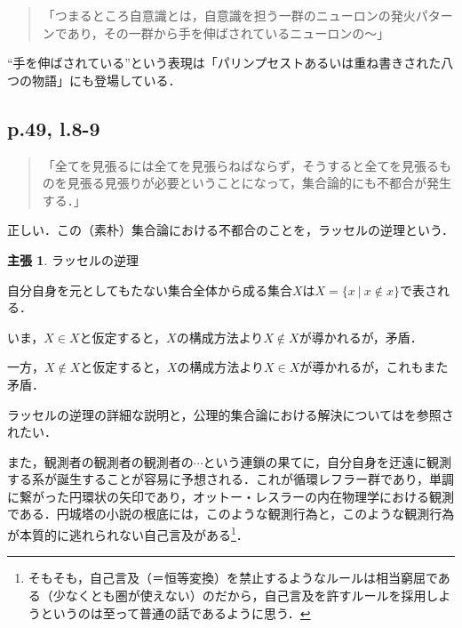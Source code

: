 \documentclass[10pt, a5paper, twoside]{jsarticle}
\theoremstyle{definition}
\newtheorem{clm}{主張}
\begin{document}
                \begin{quote}

                    「つまるところ自意識とは，自意識を担う一群のニューロンの発火パターンであり，その一群から手を伸ばされているニューロンの〜」

                \end{quote}

                “手を伸ばされている”という表現は「パリンプセストあるいは重ね書きされた八つの物語」にも登場している．

            \subsection{p.49, l.8-9} \label{russel}

                \begin{quote}

                    「全てを見張るには全てを見張らねばならず，そうすると全てを見張るものを見張る見張りが必要ということになって，集合論的にも不都合が発生する．」

                \end{quote}

                正しい．この（素朴）集合論における不都合のことを，ラッセルの逆理という．

                \begin{clm}

					ラッセルの逆理

					自分自身を元としてもたない集合全体から成る集合$X$は$X = \{ x \ |\  x \notin x\} $で表される．

					いま，$X \in X$と仮定すると，$X$の構成方法より$X \notin X$が導かれるが，矛盾．

					一方，$X \notin X$と仮定すると，$X$の構成方法より$X \in X$が導かれるが，これもまた矛盾．

				\end{clm}

                ラッセルの逆理の詳細な説明と，公理的集合論における解決については\cite{rus}を参照されたい．

                また，観測者の観測者の観測者の$\cdots$という連鎖の果てに，自分自身を迂遠に観測する系が誕生することが容易に予想される．これが循環レフラー群であり，単調に繋がった円環状の矢印であり，オットー・レスラーの内在物理学における観測である．円城塔の小説の根底には，このような観測行為と，このような観測行為が本質的に逃れられない自己言及がある\footnote{そもそも，自己言及（＝恒等変換）を禁止するようなルールは相当窮屈である（少なくとも圏が使えない）のだから，自己言及を許すルールを採用しようというのは至って普通の話であるように思う．}．
\end{document}
